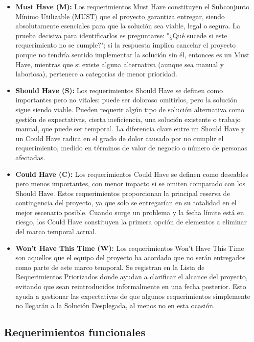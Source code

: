 \begin{itemize}
    \item \textbf{Must Have (M):} Los requerimientos Must Have constituyen el Subconjunto Mínimo Utilizable (MUST) que el proyecto garantiza entregar, siendo absolutamente esenciales para que la solución sea viable, legal o segura. La prueba decisiva para identificarlos es preguntarse: "¿Qué sucede si este requerimiento no se cumple?"; si la respuesta implica cancelar el proyecto porque no tendría sentido implementar la solución sin él, entonces es un Must Have, mientras que si existe alguna alternativa (aunque sea manual y laboriosa), pertenece a categorías de menor prioridad.
    \item \textbf{Should Have (S):} Los requerimientos Should Have se definen como importantes pero no vitales: puede ser doloroso omitirlos, pero la solución sigue siendo viable. Pueden requerir algún tipo de solución alternativa como gestión de expectativas, cierta ineficiencia, una solución existente o trabajo manual, que puede ser temporal. La diferencia clave entre un Should Have y un Could Have radica en el grado de dolor causado por no cumplir el requerimiento, medido en términos de valor de negocio o número de personas afectadas.
    \item \textbf{Could Have (C):} Los requerimientos Could Have se definen como deseables pero menos importantes, con menor impacto si se omiten comparado con los Should Have. Estos requerimientos proporcionan la principal reserva de contingencia del proyecto, ya que solo se entregarían en su totalidad en el mejor escenario posible. Cuando surge un problema y la fecha límite está en riesgo, los Could Have constituyen la primera opción de elementos a eliminar del marco temporal actual.
    \item \textbf{Won't Have This Time (W):} Los requerimientos Won't Have This Time son aquellos que el equipo del proyecto ha acordado que no serán entregados como parte de este marco temporal. Se registran en la Lista de Requerimientos Priorizados donde ayudan a clarificar el alcance del proyecto, evitando que sean reintroducidos informalmente en una fecha posterior. Esto ayuda a gestionar las expectativas de que algunos requerimientos simplemente no llegarán a la Solución Desplegada, al menos no en esta ocasión.
\end{itemize}



\subsection*{Requerimientos funcionales}

